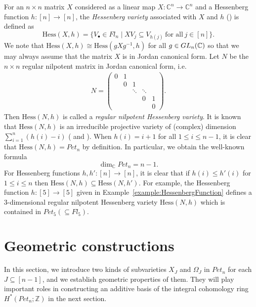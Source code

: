 \documentclass[11pt]{article}
\theoremstyle{definition}
\numberwithin{equation}{section}
\numberwithin{equation}{section}
\begin{document}
For an $n\times n$ matrix $X$ considered as a linear map $X\colon{\mathbb C}^n \to {\mathbb C}^n$ and a Hessenberg function $h\colon [n] \to [n]$, the \textit{Hessenberg variety} associated with $X$ and $h$ (\cite{DeMari-Procesi-Shayman,ty}) is defined as
\begin{equation} \label{eq:DefinitionHessenbergVariety}
\text{Hess}(X,h)=\{V_\bullet \in Fl_n \mid XV_j \subseteq V_{h(j)} \ \mbox{for all} \ j\in[n] \}.
\end{equation}
We note that $\text{Hess}(X,h)\cong \text{Hess}(gXg^{-1},h)$ for all $g\in{\rm GL}_n({\mathbb C})$ so that we may always assume that the matrix $X$ is in Jordan canonical form.
Let $N$ be the $n\times n$ regular nilpotent matrix in Jordan canonical form, i.e. 
\begin{align}\label{eq: def of N}
N =
\begin{pmatrix} 
0 & 1 & & &\\ 
& 0 & 1 & &\\
&   & \ddots & \ddots &\\
&  & & 0 & 1\\
&  & & & 0
\end{pmatrix}.
\end{align}
Then $\text{Hess}(N,h)$ is called a \textit{regular nilpotent Hessenberg variety}. It is known that $\text{Hess}(N,h)$ is an irreducible projective variety of (complex) dimension $\sum_{i=1}^n (h(i)-i)$ (\cite[Lemma 7.1]{an-ty} and \cite{ty}). When $h(i)=i+1$ for all $1\le i\le n-1$, it is clear that $\text{Hess}(N,h)=Pet_{n}$ by definition. 
In particular, we obtain the well-known formula 
\[\dim_{{\mathbb C}}Pet_{n}=n-1.\]
For Hessenberg functions $h,h'\colon[n]\rightarrow [n]$, it is clear that if $h(i)\le h'(i)$ for $1\le i\le n$ then $\text{Hess}(N,h)\subseteq \text{Hess}(N,h')$. For example, the Hessenberg function $h\colon[5]\rightarrow[5]$ given in Example~\ref{example:HessenbergFunction} defines a $3$-dimensional regular nilpotent Hessenberg variety $\text{Hess}(N,h)$ which is contained in $Pet_{5}(\subseteq Fl_5)$. 

\section{Geometric constructions}\label{sec: geometric constructions}
In this section, we introduce two kinds of subvarieties $X_J$ and $\Omega_J$ in $Pet_{n}$ for each $J\subseteq[n-1]$, and we establish geometric properties of them. They will play important roles in constructing an additive basis of the integral cohomology ring $H^*(Pet_{n};{\mathbb Z})$ in the next section.
\end{document}
